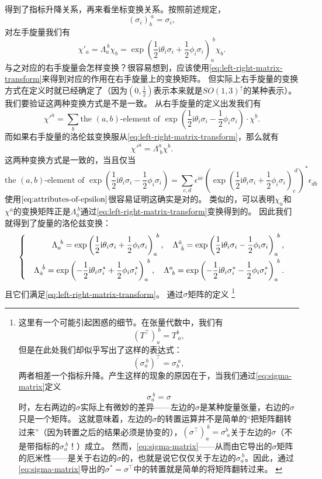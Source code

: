\documentclass[hyperref, UTF8, a4paper]{ctexart}
\newcommand*{\ii}{\mathrm{i}}
\newenvironment{bigcase}{\left\{\quad\begin{aligned}}{\end{aligned}\right.}
\begin{document}
得到了指标升降关系，再来看坐标变换关系。按照前述规定，
\[
    (\sigma_i)_b^{\ a} = \sigma_i,
\]
对左手旋量我们有
\[
    \chi'_a = \Lambda_a^{\ b} \chi_b = \exp \left( \frac{1}{2} \ii \theta_i \sigma_i + \frac{1}{2} \phi_i \sigma_i \right)_a^{\; b} \chi_b.
\]
与之对应的右手旋量会怎样变换？很容易想到，应该使用\eqref{eq:left-right-matrix-transform}来得到对应的作用在右手旋量上的变换矩阵。
但实际上右手旋量的变换方式在定义时就已经确定了（因为$(0, \frac{1}{2})$表示本来就是$SO(1,3)^\uparrow$的某种表示）。
我们要验证这两种变换方式是不是一致。
从右手旋量的定义出发我们有
\[
    {\chi'}^{\dot{a}} = \sum_b \text{the $(a,b)$-element of } \exp \left( \frac{1}{2} \ii \theta_i \sigma_i - \frac{1}{2} \phi_i \sigma_i \right) \cdot \chi^{\dot{b}} .
\]
而如果右手旋量的洛伦兹变换服从\eqref{eq:left-right-matrix-transform}，那么就有
\[
    {\chi'}^{\dot{a}} = \Lambda^{\dot{a}}_{\ \dot{b}} \chi^{\dot{b}}.
\]
这两种变换方式是一致的，当且仅当
\[
    \text{the $(a,b)$-element of } \exp \left( \frac{1}{2} \ii \theta_i \sigma_i - \frac{1}{2} \phi_i \sigma_i \right) = \sum_{c,d} \epsilon^{\dot{a} \dot{c}} \left(\exp \left( \frac{1}{2} \ii \theta_i \sigma_i + \frac{1}{2} \phi_i \sigma_i \right)_c^{\; d}\right)^* \epsilon_{\dot{d} \dot{b}}
\]
使用$\eqref{eq:attributes-of-epsilon}$很容易证明这确实是对的。
类似的，可以表明$\chi_{\dot{a}}$和$\chi^a$的变换矩阵正是$\Lambda_a^{\ b}$通过\eqref{eq:left-right-matrix-transform}变换得到的。
因此我们就得到了旋量的洛伦兹变换：
\begin{equation}
    \begin{bigcase}
        \Lambda_a^{\ b} = \exp \left( \frac{1}{2} \ii \theta_i \sigma_i + \frac{1}{2} \phi_i \sigma_i \right)_a^{\ b}, \quad \Lambda^{\dot{a}}_{\ \dot{b}} = \exp \left( \frac{1}{2} \ii \theta_i \sigma_i - \frac{1}{2} \phi_i \sigma_i \right)_a^{\ b}, \\
        \Lambda_{\dot{a}}^{\ \dot{b}} = \exp \left( - \frac{1}{2} \ii \theta_i \sigma_i^* + \frac{1}{2} \phi_i \sigma_i^* \right)_a^{\ b}, \quad \Lambda^{a}_{\ b} = \exp \left( - \frac{1}{2} \ii \theta_i \sigma_i^* - \frac{1}{2} \phi_i \sigma_i^* \right)_a^{\ b}.
        \label{eq:lorentz-transform-on-spinors}
    \end{bigcase}
\end{equation}
且它们满足\eqref{eq:left-right-matrix-transform}。
通过$\sigma$矩阵的定义%
\footnote{这里有一个可能引起困惑的细节。在张量代数中，我们有
\[
    (T^\top)_a^{\ b} = T^b_{\ a},
\]
但是在此处我们却似乎写出了这样的表达式：
\[
    (\sigma_a^{\ b})^\top = \sigma_b^{\ a},
\]
两者相差一个指标升降。产生这样的现象的原因在于，当我们通过\eqref{eq:sigma-matrix}定义
\[
    \sigma_a^{\ b} = \sigma
\]
时，左右两边的$\sigma$实际上有微妙的差异——左边的$\sigma$是某种旋量张量，右边的$\sigma$只是一个矩阵。
这就意味着，左边的$\sigma$的转置运算并不是简单的“把矩阵翻转过来”（因为转置之后的结果必须是协变的），$(\sigma^\top)_a^{\ b} = \sigma^b_{\ a}$关于左边的$\sigma$（不是带指标的$\sigma_a^{\ b}$！）成立。
然而，\eqref{eq:sigma-matrix}——从而由它导出的$\sigma$矩阵的厄米性——是关于右边的$\sigma$的，也就是说它仅仅关于左边的$\sigma_a^{\ b}$。因此，通过\eqref{eq:sigma-matrix}导出的$\sigma^*=\sigma^\top$中的转置就是简单的将矩阵翻转过来。
\label{note:confusion-by-transpose}
}%
\end{document}
